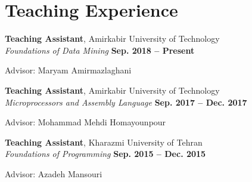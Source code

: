 \section{\sc Teaching Experience}

{\bf Teaching Assistant}, Amirkabir University of Technology \\ 
\vspace{0.1cm}
\textit{Foundations of Data Mining} \hfill{\textbf{Sep. 2018 -- Present}} \\
\vspace{-0.4cm}
\begin{list2}
	\item Advisor: Maryam Amirmazlaghani
\end{list2}


{\bf Teaching Assistant}, Amirkabir University of Technology \\ 
\vspace{0.1cm}
\textit{Microprocessors and Assembly Language} \hfill{\textbf{Sep. 2017 -- Dec. 2017}} \\
\vspace{-0.4cm}
\begin{list2}
	\item Advisor: Mohammad Mehdi Homayounpour
\end{list2}

{\bf Teaching Assistant}, Kharazmi University of Tehran \\ 
\vspace{0.1cm}
\textit{Foundations of Programming} \hfill{\textbf{Sep. 2015 -- Dec. 2015}} \\
\vspace{-0.4cm}
\begin{list2}
	\item Advisor: Azadeh Mansouri
\end{list2}

\endinput